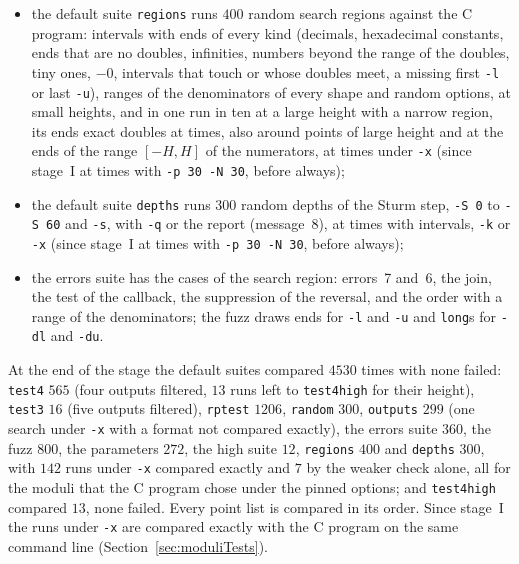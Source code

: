 \begin{itemize}
    \verb|process| of \verb|main.c| tests them;
  \item the default suite \verb|regions| runs $400$ random search regions against the C program:
    intervals with ends of every kind (decimals, hexadecimal constants, ends that are no doubles,
    infinities, numbers beyond the range of the doubles, tiny ones, $-0$, intervals that touch or
    whose doubles meet, a missing first \verb|-l| or last \verb|-u|), ranges of the denominators of
    every shape and random options, at small heights, and in one run in ten at a large height with a
    narrow region, its ends exact doubles at times, also around points of large height and at the
    ends of the range $[-H, H]$ of the numerators, at times under \verb|-x| (since stage~I at times
    with \verb|-p 30 -N 30|, before always);
  \item the default suite \verb|depths| runs $300$ random depths of the Sturm step, \verb|-S 0| to
    \verb|-S 60| and \verb|-s|, with \verb|-q| or the report (message~8), at times with intervals,
    \verb|-k| or \verb|-x| (since stage~I at times with \verb|-p 30 -N 30|, before always);
  \item the errors suite has the cases of the search region: errors~7 and~6, the join, the test of
    the callback, the suppression of the reversal, and the order with a range of the denominators;
    the fuzz draws ends for \verb|-l| and \verb|-u| and \verb|long|s for \verb|-dl| and \verb|-du|.
\end{itemize}
At the end of the stage the default suites compared $4530$ times with none failed: \verb|test4|
$565$ (four outputs filtered, $13$ runs left to \verb|test4high| for their height), \verb|test3|
$16$ (five outputs filtered), \verb|rptest| $1206$, \verb|random| $300$, \verb|outputs| $299$ (one
search under \verb|-x| with a format not compared exactly), the errors suite $360$, the fuzz $800$,
the parameters $272$, the high suite $12$, \verb|regions| $400$ and \verb|depths| $300$, with $142$
runs under \verb|-x| compared exactly and $7$ by the weaker check alone, all for the moduli that the
C program chose under the pinned options; and \verb|test4high| compared $13$, none failed. Every
point list is compared in its order. Since stage~I the runs under \verb|-x| are compared exactly
with the C program on the same command line (Section~\ref{sec:moduliTests}).

